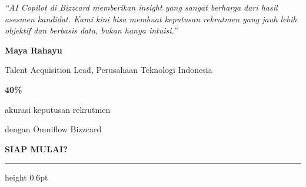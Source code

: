 \documentclass[a4paper]{article}
\newcommand{\sectiontitle}[1]{%
    \vspace{10pt}%
    {\fontsize{13}{16}\selectfont\bfseries\color{BlueDark} #1}\par\vspace{3pt}%
    {\color{BluePrimary}\hrule height 0.6pt}\par\vspace{8pt}%
}
\begin{document}
\noindent
\begin{minipage}[t]{0.485\textwidth}
    \colorbox{BlueBg}{%
        \begin{minipage}{\dimexpr\linewidth-2\fboxsep\relax}
            {\fontsize{9.5}{13}\selectfont\color{TextDark}\textit{``AI Copilot di Bizzcard memberikan insight yang sangat berharga dari hasil asesmen kandidat. Kami kini bisa membuat keputusan rekrutmen yang jauh lebih objektif dan berbasis data, bukan hanya intuisi.''}}\par\vspace{4pt}
            {\fontsize{8.5}{11}\selectfont\bfseries\color{BluePrimary} Maya Rahayu}\par
            {\fontsize{8}{10}\selectfont\color{TextLight} Talent Acquisition Lead, Perusahaan Teknologi Indonesia}
        \end{minipage}}
\end{minipage}%
\hfill
\begin{minipage}[t]{0.485\textwidth}
    \colorbox{BlueBg}{%
        \begin{minipage}{\dimexpr\linewidth-2\fboxsep\relax}
            \begin{center}
                {\fontsize{20}{24}\selectfont\bfseries\color{FuchsiaPrimary} 40\%}\par
                {\fontsize{9.5}{12}\selectfont\color{TextDark} akurasi keputusan rekrutmen}\par
                {\fontsize{9.5}{12}\selectfont\color{TextDark} dengan Omniflow Bizzcard}
            \end{center}
        \end{minipage}}
\end{minipage}

\sectiontitle{SIAP MULAI?}
\end{document}
